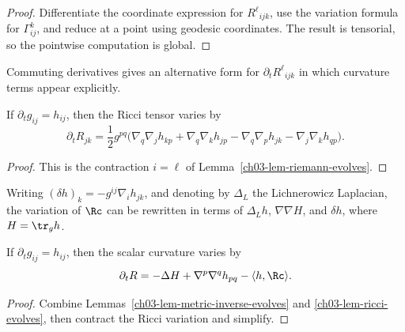 \begin{proof}
\sketch Differentiate the coordinate expression for \(R^\ell{}_{ijk}\), use the variation formula for \(\Gamma^k_{ij}\), and reduce at a point using geodesic coordinates. The result is tensorial, so the pointwise computation is global.
\end{proof}

\begin{remark}
\label{ch03-rem-riemann-alt-form}
Commuting derivatives gives an alternative form for \(\partial_t R^\ell{}_{ijk}\) in which curvature terms appear explicitly.
\end{remark}

\begin{lemma}
\label{ch03-lem-ricci-evolves}
If \(\partial_t g_{ij}=h_{ij}\), then the Ricci tensor varies by
\[
\partial_t R_{jk}
=\frac12 g^{pq}\bigl(\nabla_q\nabla_j h_{kp}
+\nabla_q\nabla_k h_{jp}
-\nabla_q\nabla_p h_{jk}
-\nabla_j\nabla_k h_{qp}\bigr).
\]
\end{lemma}

\begin{proof}
\sketch This is the contraction \(i=\ell\) of Lemma~\ref{ch03-lem-riemann-evolves}.
\end{proof}

\begin{remark}
\label{ch03-rem-lichnerowicz-laplacian}
Writing \((\delta h)_k=-g^{ij}\nabla_i h_{jk}\), and denoting by \(\Delta_L\) the Lichnerowicz Laplacian, the variation of \(\Rc\) can be rewritten in terms of \(\Delta_L h\), \(\nabla\nabla H\), and \(\delta h\), where \(H=\tr_g h\).
\end{remark}

\begin{lemma}
\label{ch03-lem-scalar-curvature-evolves}
If \(\partial_t g_{ij}=h_{ij}\), then the scalar curvature varies by
\[
\partial_t R
=-\Delta H+\nabla^p\nabla^q h_{pq}-\langle h,\Rc\rangle.
\]
\end{lemma}

\begin{proof}
\sketch Combine Lemmas~\ref{ch03-lem-metric-inverse-evolves} and \ref{ch03-lem-ricci-evolves}, then contract the Ricci variation and simplify.
\end{proof}

